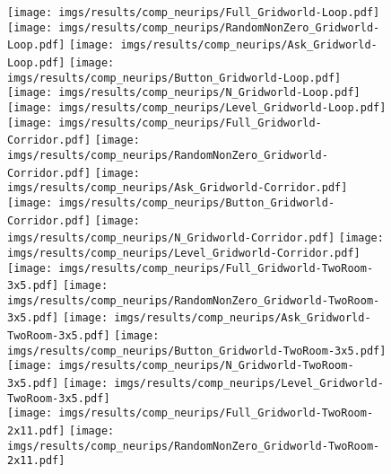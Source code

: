 \begin{figure}[tbh]
    \texttt{[image: imgs/results/comp\_neurips/Full\_Gridworld-Loop.pdf]}
    \hfill
     \texttt{[image: imgs/results/comp\_neurips/RandomNonZero\_Gridworld-Loop.pdf]}
    \hfill
    \texttt{[image: imgs/results/comp\_neurips/Ask\_Gridworld-Loop.pdf]}
    \hfill
     \texttt{[image: imgs/results/comp\_neurips/Button\_Gridworld-Loop.pdf]} 
    \hfill
    \texttt{[image: imgs/results/comp\_neurips/N\_Gridworld-Loop.pdf]}
    \hfill
    \texttt{[image: imgs/results/comp\_neurips/Level\_Gridworld-Loop.pdf]}
    \\
    \hfill
    \texttt{[image: imgs/results/comp\_neurips/Full\_Gridworld-Corridor.pdf]}
    \hfill
     \texttt{[image: imgs/results/comp\_neurips/RandomNonZero\_Gridworld-Corridor.pdf]}
    \hfill
    \texttt{[image: imgs/results/comp\_neurips/Ask\_Gridworld-Corridor.pdf]}
    \hfill
     \texttt{[image: imgs/results/comp\_neurips/Button\_Gridworld-Corridor.pdf]} 
    \hfill
    \texttt{[image: imgs/results/comp\_neurips/N\_Gridworld-Corridor.pdf]}
    \hfill
    \texttt{[image: imgs/results/comp\_neurips/Level\_Gridworld-Corridor.pdf]}
    \\
    \hfill
    \texttt{[image: imgs/results/comp\_neurips/Full\_Gridworld-TwoRoom-3x5.pdf]}
    \hfill
     \texttt{[image: imgs/results/comp\_neurips/RandomNonZero\_Gridworld-TwoRoom-3x5.pdf]}
    \hfill
    \texttt{[image: imgs/results/comp\_neurips/Ask\_Gridworld-TwoRoom-3x5.pdf]}
    \hfill
     \texttt{[image: imgs/results/comp\_neurips/Button\_Gridworld-TwoRoom-3x5.pdf]} 
    \hfill
    \texttt{[image: imgs/results/comp\_neurips/N\_Gridworld-TwoRoom-3x5.pdf]}
    \hfill
    \texttt{[image: imgs/results/comp\_neurips/Level\_Gridworld-TwoRoom-3x5.pdf]}
    \\
    \hfill
    \texttt{[image: imgs/results/comp\_neurips/Full\_Gridworld-TwoRoom-2x11.pdf]}
    \hfill
     \texttt{[image: imgs/results/comp\_neurips/RandomNonZero\_Gridworld-TwoRoom-2x11.pdf]}

\end{figure}
